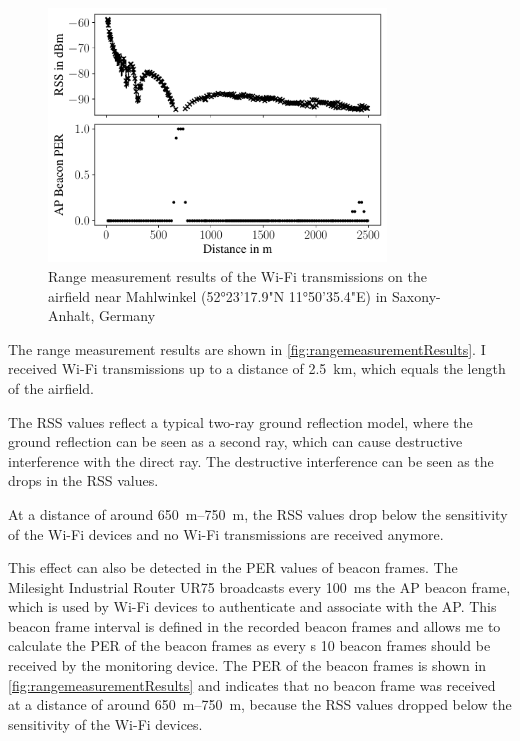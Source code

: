 \begin{figure}[]%
   \centering
   \includegraphics[width=0.8\textwidth]{Latex/figures/rangeMeasurementResults2}
   \caption{Range measurement results of the Wi-Fi transmissions on the airfield near Mahlwinkel (52°23'17.9"N 11°50'35.4"E) in Saxony-Anhalt, Germany}
   \label{fig:rangemeasurementResults}%
\end{figure}

The range measurement results are shown in \autoref{fig:rangemeasurementResults}.
I received Wi-Fi transmissions up to a distance of \SI{2.5}{\kilo\metre},
which equals the length of the airfield.

The \ac{RSS} values reflect a typical two-ray ground reflection model, where the ground reflection can be seen as a second ray,
which can cause destructive interference with the direct ray.
The destructive interference can be seen as the drops in the \ac{RSS} values.

At a distance of around \SIrange{650}{750}{\metre}, the \ac{RSS} values drop below the sensitivity of the Wi-Fi devices and
no Wi-Fi transmissions are received anymore.

This effect can also be detected in the \ac{PER} values of beacon frames.
The Milesight Industrial Router UR75 broadcasts every \SI{100}{\milli\second} the \ac{AP} beacon frame, which is used by Wi-Fi devices to
authenticate and associate with the \ac{AP}.
This beacon frame interval is defined in the recorded beacon frames and allows me to
calculate the \ac{PER} of the beacon frames as every \si{\second} \num{10} beacon frames should be received by the monitoring device.
The \ac{PER} of the beacon frames is shown in \autoref{fig:rangemeasurementResults} and indicates that no beacon frame was received at
a distance of around \SIrange{650}{750}{\metre}, because the \ac{RSS} values dropped below the sensitivity of the Wi-Fi devices.

